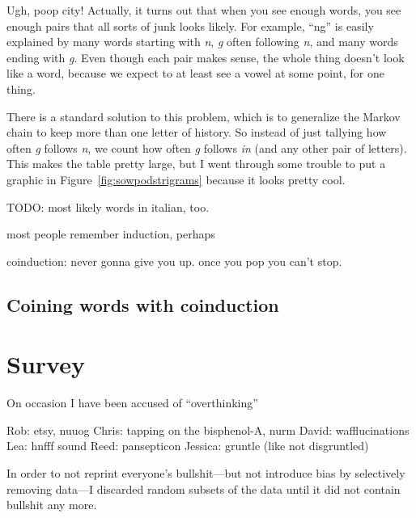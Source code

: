 \documentclass[twocolumn]{article}
\begin{document}
Ugh, poop city! Actually, it turns out that when you see enough words,
you see enough pairs that all sorts of junk looks likely. For example,
``ng'' is easily explained by many words starting with {\it n}, {\it
g} often following {\it n}, and many words ending with {\it g}. Even
though each pair makes sense, the whole thing doesn't look like a word,
because we expect to at least see a vowel at some point, for one thing.

There is a standard solution to this problem, which is to generalize
the Markov chain to keep more than one letter of history. So instead
of just tallying how often {\it g} follows {\it n}, we count how often
{\it g} follows {\it in} (and any other pair of letters). This makes
the table pretty large, but I went through some trouble to put a
graphic in Figure~\ref{fig:sowpodstrigrams} because it looks pretty
cool.


TODO: most likely words in italian, too.

most people remember induction, perhaps 

coinduction: never gonna give you up. once you pop you can't stop.


\subsection{Coining words with coinduction} \label{sec:coin}


\section{Survey}

On occasion I have been accused of ``overthinking'' 

Rob: etsy, nuuog
Chris: tapping on the bisphenol-A, nurm
David: wafflucinations
Lea: hnfff sound
Reed: pansepticon
Jessica: gruntle (like not disgruntled)

In order to not reprint everyone's bullshit---but not introduce bias by selectively removing data---I discarded random subsets of the data until it did not contain bullshit any more.
\end{document}
